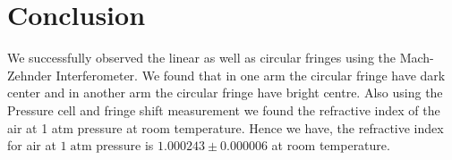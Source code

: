 \section{Conclusion}
We successfully observed the linear as well as circular fringes using the Mach-Zehnder Interferometer. We found that in one arm the circular fringe have dark center and in another arm the circular fringe have bright centre. Also using the Pressure cell and fringe shift measurement we found the refractive index of the air at 1 atm pressure at room temperature. Hence we have, the refractive index for air at $1 \; \text{atm}$ pressure is $1.000243 \pm 0.000006$ at room temperature.

